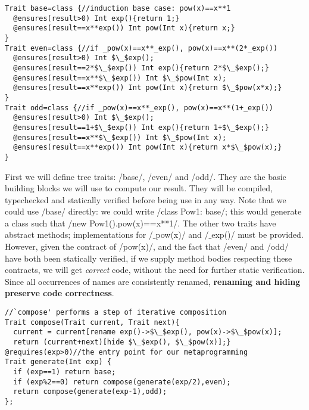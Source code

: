 \begin{lstlisting}
Trait base=class {//induction base case: pow(x)==x**1
  @ensures(result>0) Int exp(){return 1;}  
  @ensures(result==x**exp()) Int pow(Int x){return x;}
}
Trait even=class {//if _pow(x)==x**_exp(), pow(x)==x**(2*_exp())
  @ensures(result>0) Int $\_$exp();
  @ensures(result==2*$\_$exp()) Int exp(){return 2*$\_$exp();}
  @ensures(result==x**$\_$exp()) Int $\_$pow(Int x);
  @ensures(result==x**exp()) Int pow(Int x){return $\_$pow(x*x);}
}
Trait odd=class {//if _pow(x)==x**_exp(), pow(x)==x**(1+_exp())
  @ensures(result>0) Int $\_$exp();
  @ensures(result==1+$\_$exp()) Int exp(){return 1+$\_$exp();}
  @ensures(result==x**$\_$exp()) Int $\_$pow(Int x);
  @ensures(result==x**exp()) Int pow(Int x){return x*$\_$pow(x);}
}
\end{lstlisting}
First we will define tree traits: /base/, /even/ and /odd/.
They are the basic building blocks we will use to compute our result. They will be compiled, typechecked and statically verified before being use in any way.
Note that we could use /base/ directly:
we could write /class Pow1: base/; this would generate a class such that /new Pow1().pow(x)==x**1/.
The other two traits have abstract methods; implementations for /$\_$pow(x)/ and /$\_$exp()/ must be provided. However, given the contract of /pow(x)/,
and the fact that /even/ and /odd/ have both been statically verified,
if we supply method bodies respecting these contracts, we will get \emph{correct} code, without the need for further static verification.
Since all occurrences of names are consistently renamed, \textbf{renaming and hiding preserve code correctness}.

\begin{lstlisting}
//`compose' performs a step of iterative composition
Trait compose(Trait current, Trait next){
  current = current[rename exp()->$\_$exp(), pow(x)->$\_$pow(x)];
  return (current+next)[hide $\_$exp(), $\_$pow(x)];}
@requires(exp>0)//the entry point for our metaprogramming
Trait generate(Int exp) {
  if (exp==1) return base;
  if (exp%2==0) return compose(generate(exp/2),even);
  return compose(generate(exp-1),odd);
};
\end{lstlisting}

